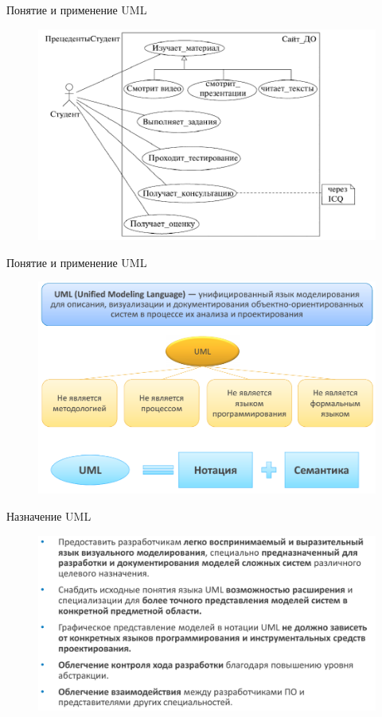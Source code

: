 \documentclass{beamer}
\begin{document}
\begin{frame}[t]{Понятие и применение UML}
\begin{figure}[h]
\centering
\includegraphics[scale=0.45]{images/lec03-pic03.png}
\end{figure}
\end{frame} 

\begin{frame}[t]{Понятие и применение UML}
\begin{figure}[h]
\centering
\includegraphics[scale=0.45]{images/lec03-pic04.png}
\end{figure}
\end{frame}

\begin{frame}[t]{Назначение UML}
\begin{figure}[h]
\centering
\includegraphics[scale=0.5]{images/lec03-pic05.png}
\end{figure}
\end{frame}
\end{document}
